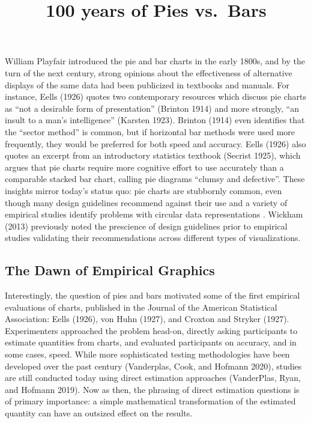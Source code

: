 \documentclass[
  10pt,
  letterpaper,
  twocolumn]{article}
\title{100 years of Pies vs.~Bars}
\date{}
\begin{document}
\maketitle


William Playfair introduced the pie and bar charts in the early 1800s,
and by the turn of the next century, strong opinions about the
effectiveness of alternative displays of the same data had been
publicized in textbooks and manuals. For instance, Eells (1926) quotes
two contemporary resources which discuss pie charts as ``not a desirable
form of presentation'' (Brinton 1914) and more strongly, ``an insult to
a man's intelligence'' (Karsten 1923). Brinton (1914) even identifies
that the ``sector method'' is common, but if horizontal bar methods were
used more frequently, they would be preferred for both speed and
accuracy. Eells (1926) also quotes an excerpt from an introductory
statistics textbook (Secrist 1925), which argues that pie charts require
more cognitive effort to use accurately than a comparable stacked bar
chart, calling pie diagrams ``clumsy and defective''. These insights
mirror today's status quo: pie charts are stubbornly common, even though
many design guidelines recommend against their use and a variety of
empirical studies identify problems with circular data representations .
Wickham (2013) previously noted the prescience of design guidelines
prior to empirical studies validating their recommendations across
different types of visualizations.

\subsection{The Dawn of Empirical
Graphics}\label{the-dawn-of-empirical-graphics}

Interestingly, the question of pies and bars motivated some of the first
empirical evaluations of charts, published in the Journal of the
American Statistical Association: Eells (1926), von Huhn (1927), and
Croxton and Stryker (1927). Experimenters approached the problem
head-on, directly asking participants to estimate quantities from
charts, and evaluated participants on accuracy, and in some cases,
speed. While more sophisticated testing methodologies have been
developed over the past century (Vanderplas, Cook, and Hofmann 2020),
studies are still conducted today using direct estimation approaches
(VanderPlas, Ryan, and Hofmann 2019). Now as then, the phrasing of
direct estimation questions is of primary importance: a simple
mathematical transformation of the estimated quantity can have an
outsized effect on the results.
\end{document}
